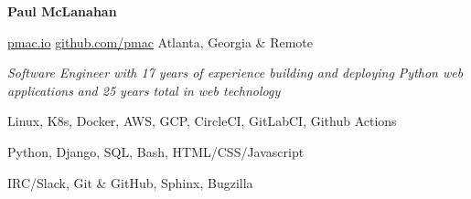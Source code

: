 \documentclass[11pt]{article} %
\begin{document}
\centerline{{\Huge \bf Paul McLanahan}}

\bigskip

        {\href{https://pmac.io}{pmac.io}}
        {\href{https://github.com/pmac}{github.com/pmac}}
        {Atlanta, Georgia \& Remote}


\center
\emph{Software Engineer with 17 years of experience building and deploying Python web applications}
\linebreak
\emph{and 25 years total in web technology}
\endcenter

      {Linux, K8s, Docker, AWS, GCP, CircleCI, GitLabCI, Github Actions}

      {Python, Django, SQL, Bash, HTML/CSS/Javascript}

      {IRC/Slack, Git \& GitHub, Sphinx, Bugzilla}

\end{document}
